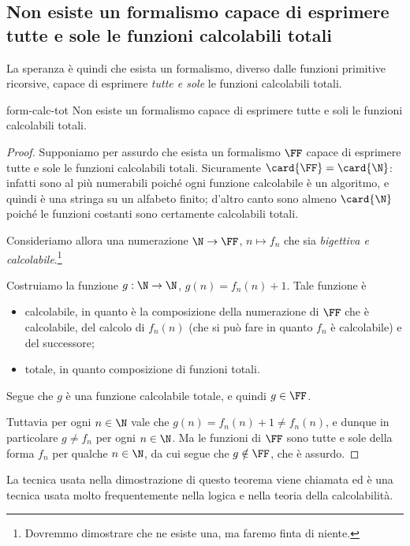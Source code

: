 \subsection{Non esiste un formalismo capace di esprimere tutte e sole le funzioni calcolabili totali}

La speranza è quindi che esista un formalismo, diverso dalle funzioni primitive ricorsive, capace di esprimere \emph{tutte e sole} le funzioni calcolabili totali. 

\begin{theorem}
    {}{form-calc-tot}
    Non esiste un formalismo capace di esprimere tutte e soli le funzioni calcolabili totali.
\end{theorem}
\begin{proof}
    Supponiamo per assurdo che esista un formalismo $\FF$ capace di esprimere tutte e sole le funzioni calcolabili totali. Sicuramente $\card{\FF} = \card{\N}$: infatti sono al più numerabili poiché ogni funzione calcolabile è un algoritmo, e quindi è una stringa su un alfabeto finito; d'altro canto sono almeno $\card{\N}$ poiché le funzioni costanti sono certamente calcolabili totali.
    
    Consideriamo allora una numerazione $\N \to \FF$, $n \mapsto f_n$ che sia \emph{bigettiva e calcolabile}.\footnote{Dovremmo dimostrare che ne esiste una, ma faremo finta di niente.}
    
    Costruiamo la funzione $g : \N \to \N$, $g(n) = f_n(n) + 1$. Tale funzione è \begin{itemize}
        \item calcolabile, in quanto è la composizione della numerazione di $\FF$ che è calcolabile, del calcolo di $f_n(n)$ (che si può fare in quanto $f_n$ è calcolabile) e del successore;
        \item totale, in quanto composizione di funzioni totali.    
    \end{itemize}  
    Segue che $g$ è una funzione calcolabile totale, e quindi $g \in \FF$.
    
    Tuttavia per ogni $n \in \N$ vale che $g(n) = f_n(n) + 1 \neq f_n(n)$, e dunque in particolare $g \neq f_n$ per ogni $n \in \N$. Ma le funzioni di $\FF$ sono tutte e sole della forma $f_n$ per qualche $n \in \N$, da cui segue che $g \notin \FF$, che è assurdo.     
\end{proof}

La tecnica usata nella dimostrazione di questo teorema viene chiamata  ed è una tecnica usata molto frequentemente nella logica e nella teoria della calcolabilità.